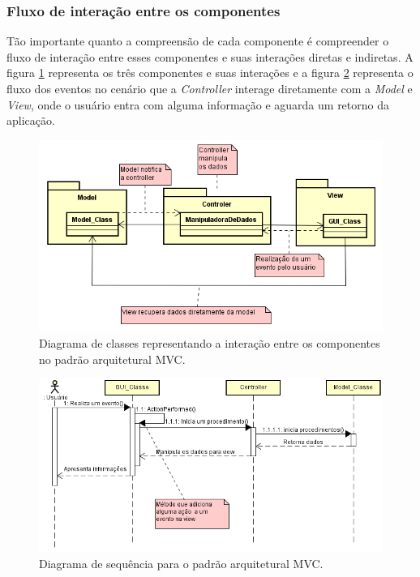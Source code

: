 \subsubsection{Fluxo de interação entre os componentes}

Tão importante quanto a compreensão de cada componente é compreender o fluxo de interação entre esses componentes e suas interações diretas e indiretas. A figura \ref{DiagramaDeClasseMVC} representa os três componentes e suas interações e a figura \ref{DiagramaDeSequenciaMVC} representa o fluxo dos eventos no cenário que a \textit{Controller} interage diretamente com a \textit{Model} e \textit{View}, onde o usuário entra com alguma informação e aguarda um retorno da aplicação. 


\begin{figure}[h!]
	\centering
	\includegraphics[keepaspectratio=true,scale=1.0]{figuras/DiagramaDeClasseMVC.PNG}
	\caption{Diagrama de classes representando a interação entre os componentes no padrão arquitetural MVC.}
	\label{DiagramaDeClasseMVC}
\end{figure}

\begin{figure}[h!]
	\centering
	\includegraphics[keepaspectratio=true,scale=0.8]{figuras/DiagramaDeSequenciaMVC.PNG}
	\caption{Diagrama de sequência para o padrão arquitetural MVC.}
	\label{DiagramaDeSequenciaMVC}
\end{figure}



